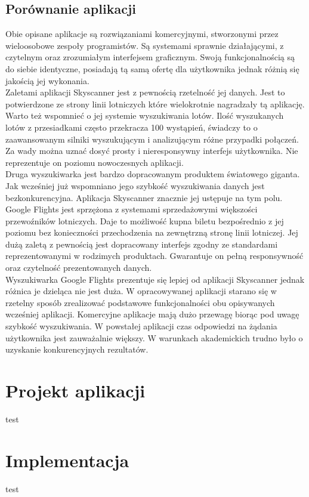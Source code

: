 \documentclass[12pt, twoside]{report}
\begin{document}
\section{Porównanie aplikacji}
Obie opisane aplikacje są rozwiązaniami komercyjnymi, stworzonymi przez wieloosobowe zespoły programistów. Są systemami sprawnie działającymi, z czytelnym oraz zrozumiałym interfejsem graficznym. Swoją funkcjonalnością są do siebie identyczne, posiadają tą samą ofertę dla użytkownika jednak różnią się jakością jej wykonania. \\ \indent
Zaletami aplikacji Skyscanner jest z pewnością rzetelność jej danych. Jest to potwierdzone ze strony linii lotniczych które wielokrotnie nagradzały tą aplikację. Warto też wspomnieć o jej systemie wyszukiwania lotów. Ilość wyszukanych lotów z przesiadkami często przekracza 100 wystąpień, świadczy to o zaawansowanym silniki wyszukującym i analizującym różne przypadki połączeń. Za wady można uznać dosyć prosty i nieresponsywny interfejs użytkownika. Nie reprezentuje on poziomu nowoczesnych aplikacji. \\ \indent
Druga wyszukiwarka jest bardzo dopracowanym produktem światowego giganta. Jak wcześniej już wspomniano jego szybkość wyszukiwania danych jest bezkonkurencyjna. Aplikacja Skyscanner znacznie jej ustępuje na tym polu. Google Flights jest sprzężona z systemami sprzedażowymi większości przewoźników lotniczych. Daje to możliwość kupna biletu bezpośrednio z jej poziomu bez konieczności przechodzenia na zewnętrzną stronę linii lotniczej. Jej dużą zaletą z pewnością jest dopracowany interfejs zgodny ze standardami reprezentowanymi w rodzimych produktach. Gwarantuje on pełną responsywność oraz czytelność prezentowanych danych. \\ \indent
Wyszukiwarka Google Flights prezentuje się lepiej od aplikacji Skyscanner jednak różnica je dzieląca nie jest duża. W opracowywanej aplikacji starano się w rzetelny sposób zrealizować podstawowe funkcjonalności obu opisywanych wcześniej aplikacji. Komercyjne aplikacje mają dużo przewagę biorąc pod uwagę szybkość wyszukiwania. W powstałej aplikacji czas odpowiedzi na żądania użytkownika jest zauważalnie większy. W warunkach akademickich trudno było o uzyskanie konkurencyjnych rezultatów.
\newpage

\chapter{Projekt aplikacji}
test
\newpage

\chapter{Implementacja}
test
\newpage
\end{document}
